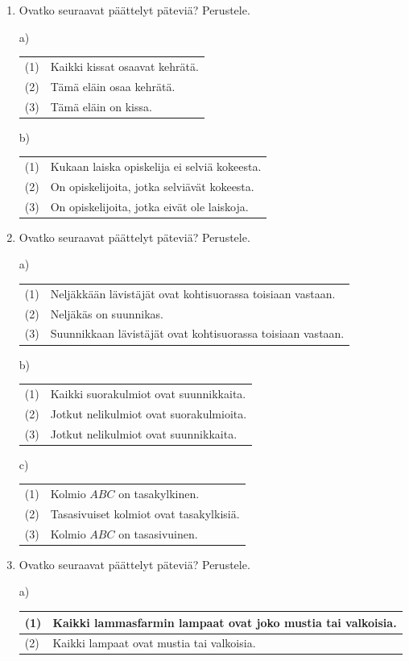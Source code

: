 \begin{enumerate}
\item Ovatko seuraavat päättelyt päteviä? Perustele.

a)
\begin{tabular}{ll}
 (1) & Kaikki kissat osaavat kehrätä.\\
 (2) & Tämä eläin osaa kehrätä. \\ \hline
 (3) & Tämä eläin on kissa.
\end{tabular}

b)
\begin{tabular}{ll}
(1) &  Kukaan laiska opiskelija ei selviä kokeesta.\\
(2) & On opiskelijoita, jotka selviävät kokeesta. \\ \hline
(3) & On opiskelijoita, jotka eivät ole laiskoja.
\end{tabular}


\item Ovatko seuraavat päättelyt päteviä? Perustele.

a)
\begin{tabular}{ll}
(1) & Neljäkkään lävistäjät ovat kohtisuorassa toisiaan vastaan.\\
(2) & Neljäkäs on suunnikas.\\ \hline
(3) & Suunnikkaan lävistäjät ovat kohtisuorassa toisiaan vastaan.
\end{tabular}

b)
\begin{tabular}{ll}
(1) & Kaikki suorakulmiot ovat suunnikkaita.\\
(2) & Jotkut nelikulmiot ovat suorakulmioita.\\ \hline
(3) & Jotkut nelikulmiot ovat suunnikkaita. 
\end{tabular}

c) 
\begin{tabular}{ll}
(1) & Kolmio $ABC$ on tasakylkinen.\\
(2) & Tasasivuiset kolmiot ovat tasakylkisiä.\\ \hline
(3) & Kolmio $ABC$ on tasasivuinen.
\end{tabular}


\item Ovatko seuraavat päättelyt päteviä? Perustele.

a)
\begin{tabular}{ll}
(1) & Kaikki lammasfarmin lampaat ovat joko mustia tai valkoisia. \\ \hline
(2) & Kaikki lampaat ovat mustia tai valkoisia.
\end{tabular}


\end{enumerate}
